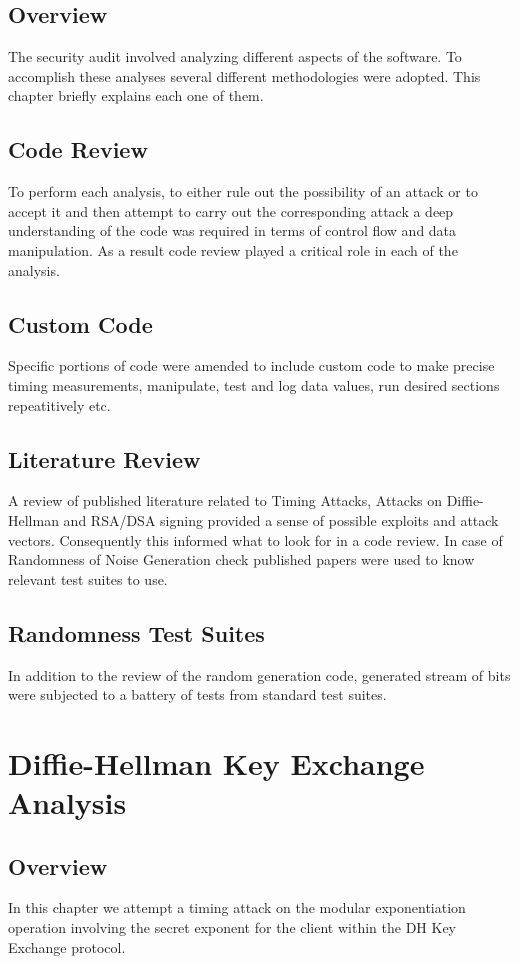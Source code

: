 \documentclass{report}
\begin{document}
\section{Overview}
The security audit involved analyzing different aspects of the software. To accomplish these analyses several different methodologies were adopted. This chapter briefly explains each one of them.
\section{Code Review}
To perform each analysis, to either rule out the possibility of an attack or to accept it and then attempt to carry out the corresponding attack a deep understanding of the code was required in terms of control flow and data manipulation. As a result code review played a critical role in each of the analysis.
\section{Custom Code}
Specific portions of code were amended to include custom code to make precise timing measurements, manipulate, test and log data values, run desired sections repeatitively etc.
\section{Literature Review}
A review of published literature related to Timing Attacks, Attacks on Diffie-Hellman and RSA/DSA signing provided a sense of possible exploits and attack vectors. Consequently this informed what to look for in a code review. In case of Randomness of Noise Generation check published papers were used to know relevant test suites to use.
\section{Randomness Test Suites}
In addition to the review of the random generation code, generated stream of bits were subjected to a battery of tests from standard test suites.
\chapter{Diffie-Hellman Key Exchange Analysis}
\section{Overview}
In this chapter we attempt a timing attack on the modular exponentiation operation involving the secret exponent for the client within the DH Key Exchange protocol.
\end{document}
